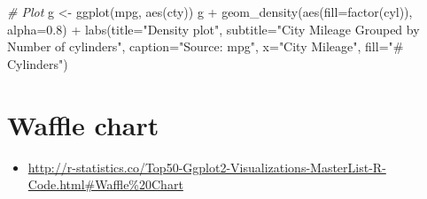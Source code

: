 \documentclass[
]{book}
\newenvironment{Shaded}{\begin{snugshade}}{\end{snugshade}}
\newcommand{\AttributeTok}[1]{\textcolor[rgb]{0.77,0.63,0.00}{#1}}
\newcommand{\CommentTok}[1]{\textcolor[rgb]{0.56,0.35,0.01}{\textit{#1}}}
\newcommand{\FloatTok}[1]{\textcolor[rgb]{0.00,0.00,0.81}{#1}}
\newcommand{\FunctionTok}[1]{\textcolor[rgb]{0.00,0.00,0.00}{#1}}
\newcommand{\NormalTok}[1]{#1}
\newcommand{\OtherTok}[1]{\textcolor[rgb]{0.56,0.35,0.01}{#1}}
\newcommand{\SpecialCharTok}[1]{\textcolor[rgb]{0.00,0.00,0.00}{#1}}
\newcommand{\StringTok}[1]{\textcolor[rgb]{0.31,0.60,0.02}{#1}}
\providecommand{\tightlist}{%
  \setlength{\itemsep}{0pt}\setlength{\parskip}{0pt}}
\begin{document}
\begin{Shaded}
\begin{Highlighting}[]
\CommentTok{\# Plot}
\NormalTok{g }\OtherTok{\textless{}{-}} \FunctionTok{ggplot}\NormalTok{(mpg, }\FunctionTok{aes}\NormalTok{(cty))}
\NormalTok{g }\SpecialCharTok{+} \FunctionTok{geom\_density}\NormalTok{(}\FunctionTok{aes}\NormalTok{(}\AttributeTok{fill=}\FunctionTok{factor}\NormalTok{(cyl)), }\AttributeTok{alpha=}\FloatTok{0.8}\NormalTok{) }\SpecialCharTok{+} 
    \FunctionTok{labs}\NormalTok{(}\AttributeTok{title=}\StringTok{"Density plot"}\NormalTok{, }
         \AttributeTok{subtitle=}\StringTok{"City Mileage Grouped by Number of cylinders"}\NormalTok{,}
         \AttributeTok{caption=}\StringTok{"Source: mpg"}\NormalTok{,}
         \AttributeTok{x=}\StringTok{"City Mileage"}\NormalTok{,}
         \AttributeTok{fill=}\StringTok{"\# Cylinders"}\NormalTok{)}
\end{Highlighting}
\end{Shaded}

\hypertarget{waffle-chart}{%
\section{Waffle chart}\label{waffle-chart}}

\begin{itemize}
\tightlist
\item
  \url{http://r-statistics.co/Top50-Ggplot2-Visualizations-MasterList-R-Code.html\#Waffle\%20Chart}
\end{itemize}
\end{document}
